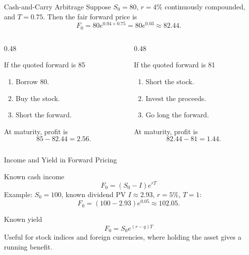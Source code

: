 \documentclass[aspectratio=169,11pt]{beamer}
\begin{document}
\begin{frame}{Cash-and-Carry Arbitrage}
    \small
    Suppose $S_0=80$, $r=4\%$ continuously compounded, and $T=0.75$.
    Then the fair forward price is
    \[
        F_0=80e^{0.04\times 0.75}=80e^{0.03}\approx 82.44.
    \]

    \begin{columns}[T]
        \begin{column}{0.48\textwidth}
            \begin{block}{If the quoted forward is 85}
                \begin{enumerate}
                    \item Borrow 80.
                    \item Buy the stock.
                    \item Short the forward.
                \end{enumerate}
                At maturity, profit is
                \[
                    85-82.44=2.56.
                \]
            \end{block}
        \end{column}
        \begin{column}{0.48\textwidth}
            \begin{block}{If the quoted forward is 81}
                \begin{enumerate}
                    \item Short the stock.
                    \item Invest the proceeds.
                    \item Go long the forward.
                \end{enumerate}
                At maturity, profit is
                \[
                    82.44-81=1.44.
                \]
            \end{block}
        \end{column}
    \end{columns}
\end{frame}

\begin{frame}{Income and Yield in Forward Pricing}
    \small
    \begin{block}{Known cash income}
        \[
            F_0=(S_0-I)e^{rT}
        \]
        Example: $S_0=100$, known dividend PV $I\approx 2.93$, $r=5\%$, $T=1$:
        \[
            F_0=(100-2.93)e^{0.05}\approx 102.05.
        \]
    \end{block}

    \begin{block}{Known yield}
        \[
            F_0=S_0e^{(r-q)T}
        \]
        Useful for stock indices and foreign currencies, where holding the asset gives a running benefit.
    \end{block}
\end{frame}
\end{document}
